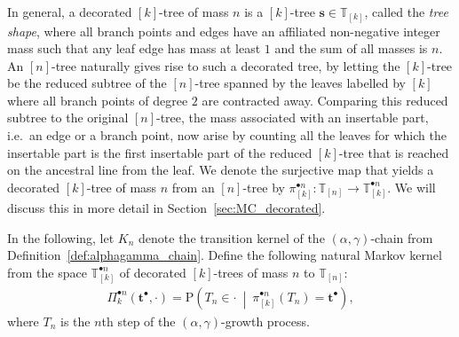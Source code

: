 \documentclass[a4paper, final]{amsart}
\theoremstyle{plain}
\theoremstyle{definition}
\newcommand{\tree}[1][t]{\boldsymbol{#1}}
\newcommand{\T}{\mathbb{T}}
\renewcommand{\P}{\mathrm{P}}
\begin{document}
In general, a decorated $[k]$-tree of mass $n$ is a $[k]$-tree $\tree[s] \in \T_{[k]}$, called the \textit{tree shape}, where all branch points and edges have an affiliated non-negative integer mass such that any leaf edge has mass at least $1$ and the sum of all masses is $n$.
An $[n]$-tree naturally gives rise to such a decorated tree, by letting the $[k]$-tree be the reduced subtree of the $[n]$-tree spanned by the leaves labelled by $[k]$ where all branch points of degree $2$ are contracted away.
Comparing this reduced subtree to the original $[n]$-tree, the mass associated with an insertable part, i.e.\ an edge or a branch point, now arise by counting all the leaves for which the insertable part is the first insertable part of the reduced $[k]$-tree that is reached on the ancestral line from the leaf.
We denote the surjective map that yields a decorated $[k]$-tree of mass $n$ from an $[n]$-tree by $\pi_{[k]}^{\bullet n} \colon \T_{[n]} \to \T_{[k]}^{\bullet n}$.
We will discuss this in more detail in Section~\ref{sec:MC_decorated}.

In the following, let $K_n$ denote the transition kernel of the $(\alpha, \gamma)$-chain from Definition~\ref{def:alphagamma_chain}.
Define the following natural Markov kernel from the space $\T_{[k]}^{\bullet n}$ of decorated $[k]$-trees of mass $n$ to $\T_{[n]}$:
%
\begin{align}
  \label{eq:markovkernel_decorated_nonplanar}
  \Pi_k^{\bullet n}(\tree^\bullet, \cdot) = \P \left( T_n \in \cdot \ \middle \vert \ \pi_{[k]}^{\bullet n} \left( T_n \right) = \tree^\bullet \right),
\end{align}
%
where $T_n$ is the $n$th step of the $(\alpha, \gamma)$-growth process.
\end{document}
